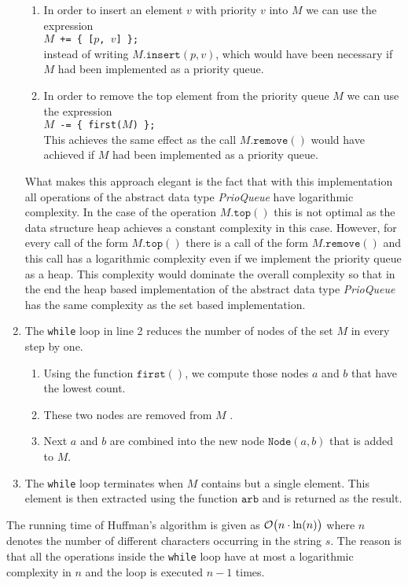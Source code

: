 \begin{enumerate}
\begin{enumerate}
      \item In order to insert an element $v$ with priority $v$ into $M$ we can use the expression
            \\[0.2cm]
            \hspace*{1.3cm}
            \texttt{$M$ += \{ [$p$, $v$] \};}
            \\[0.2cm]
            instead of writing $M.\texttt{insert}(p, v)$, which would have been necessary if $M$ had been
            implemented as a priority queue.
      \item In order to remove the top element from the priority queue $M$ we can use the expression
            \\[0.2cm]
            \hspace*{1.3cm}
            \texttt{$M$ -= \{ \texttt{first}($M$) \};}
            \\[0.2cm]
            This achieves the same effect as the call $M.\texttt{remove}()$ would have achieved if $M$ had been
            implemented as a priority queue.
      \end{enumerate}
      What makes this approach elegant is the fact that with this implementation all operations of the abstract
      data type \textsl{PrioQueue} have logarithmic complexity.  In the case of the operation
      $M.\texttt{top}()$ this is not optimal as the data structure heap achieves a constant complexity in this case.
      However, for every call of the form  $M.\texttt{top}()$ there is a call of the form
      $M.\texttt{remove}()$ and this call has a logarithmic complexity even if we implement the priority queue
      as a heap.   This complexity would dominate the overall complexity so that in the end the heap based
      implementation of the abstract data type \textsl{PrioQueue} has the same complexity as the set based
      implementation. 
\item The \texttt{while} loop in line 2 reduces the number of nodes of the set $M$ in every step by one.
      \begin{enumerate}
      \item Using the function $\texttt{first}()$, we compute those nodes $a$ and $b$ that have the lowest count.
      \item These two nodes are removed from $M$ .
      \item Next $a$ and $b$ are combined into the new node $\texttt{Node}(a,b)$ that is added to $M$.
      \end{enumerate}
\item The \texttt{while} loop terminates when $M$ contains but a single element.  This element
      is then extracted using the function $\texttt{arb}$ and is returned as the result.
\end{enumerate}
The running time of Huffman's algorithm is given as  $\mathcal{O}\bigl(n \cdot \ln(n)\bigr)$ where $n$ denotes the
number of different characters occurring in the string $s$.  The reason is that all
the operations inside the \texttt{while} loop have at most a logarithmic complexity in $n$ and the loop is
executed $n-1$ times.
 

